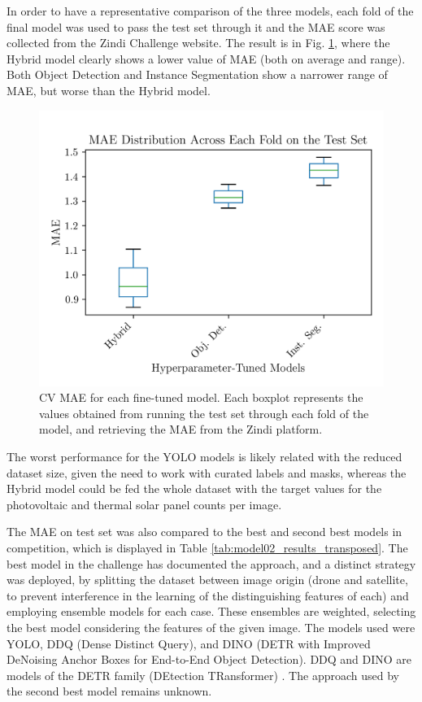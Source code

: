 \documentclass[conference]{IEEEtran}
\begin{document}
In order to have a representative comparison of the three models, each fold of the final model was used to pass the test set through it and the MAE score was collected from the Zindi Challenge website. The result is in Fig. \ref{fig:results_mae_boxplot}, where the Hybrid model clearly shows a lower value of MAE (both on average and range). Both Object Detection and Instance Segmentation show a narrower range of MAE, but worse than the Hybrid model.
\begin{figure}[H]
    \centering
    \includegraphics[width=1\linewidth]{assets/results_mae_boxplot.png}
    \caption{CV MAE for each fine-tuned model. Each boxplot represents the values obtained from running the test set through each fold of the model, and retrieving the MAE from the Zindi platform.}
    \label{fig:results_mae_boxplot}
\end{figure}

The worst performance for the YOLO models is likely related with the reduced dataset size, given the need to work with curated labels and masks, whereas the Hybrid model could be fed the whole dataset with the target values for the photovoltaic and thermal solar panel counts per image.

The MAE on test set was also compared to the best and second best models in competition, which is displayed in Table \ref{tab:model02_results_transposed}. The best model in the challenge has documented the approach, and a distinct strategy was deployed, by splitting the dataset between image origin (drone and satellite, to prevent interference in the learning of the distinguishing features of each) and employing ensemble models for each case. These ensembles are weighted, selecting the best model considering the features of the given image. The models used were YOLO, DDQ (Dense Distinct Query), and DINO (DETR with Improved DeNoising Anchor Boxes for End-to-End Object Detection). DDQ and DINO are models of the DETR family (DEtection TRansformer) \cite{zindi_lacuna_solar_survey}. The approach used by the second best model remains unknown.
\end{document}
